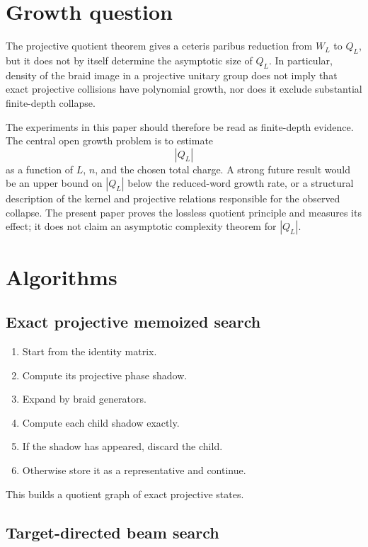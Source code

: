 \documentclass[11pt]{article}
\begin{document}
\section{Growth question}

The projective quotient theorem gives a ceteris paribus reduction from $W_L$ to $Q_L$, but it does not by itself determine the asymptotic size of $Q_L$.  In particular, density of the braid image in a projective unitary group does not imply that exact projective collisions have polynomial growth, nor does it exclude substantial finite-depth collapse.

The experiments in this paper should therefore be read as finite-depth evidence.  The central open growth problem is to estimate
\[
    |Q_L|
\]
as a function of $L$, $n$, and the chosen total charge.  A strong future result would be an upper bound on $|Q_L|$ below the reduced-word growth rate, or a structural description of the kernel and projective relations responsible for the observed collapse.  The present paper proves the lossless quotient principle and measures its effect; it does not claim an asymptotic complexity theorem for $|Q_L|$.


\section{Algorithms}

\subsection{Exact projective memoized search}

\begin{enumerate}[label=\arabic*.]
    \item Start from the identity matrix.
    \item Compute its projective phase shadow.
    \item Expand by braid generators.
    \item Compute each child shadow exactly.
    \item If the shadow has appeared, discard the child.
    \item Otherwise store it as a representative and continue.
\end{enumerate}

This builds a quotient graph of exact projective states.

\subsection{Target-directed beam search}
\end{document}

